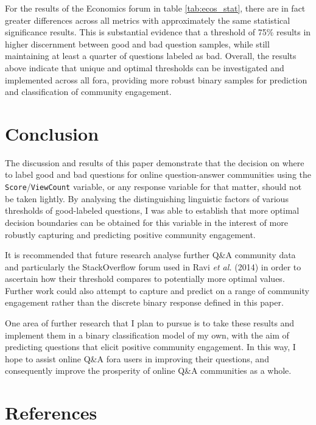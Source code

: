 \documentclass[12pt,preprint, authoryear]{article}
\numberwithin{equation}{section}
\numberwithin{figure}{section}
\numberwithin{table}{section}
\begin{document}
\normalsize

\newpage

For the results of the Economics forum in table \ref{tab:ecos_stat},
there are in fact greater differences across all metrics with
approximately the same statistical significance results. This is
substantial evidence that a threshold of 75\% results in higher
discernment between good and bad question samples, while still
maintaining at least a quarter of questions labeled as bad. Overall, the
results above indicate that unique and optimal thresholds can be
investigated and implemented across all fora, providing more robust
binary samples for prediction and classification of community
engagement.

\section{\texorpdfstring{Conclusion
\label{Concl}}{Conclusion }}\label{conclusion}

The discussion and results of this paper demonstrate that the decision
on where to label good and bad questions for online question-answer
communities using the \texttt{Score}/\texttt{ViewCount} variable, or any
response variable for that matter, should not be taken lightly. By
analysing the distinguishing linguistic factors of various thresholds of
good-labeled questions, I was able to establish that more optimal
decision boundaries can be obtained for this variable in the interest of
more robustly capturing and predicting positive community engagement.

It is recommended that future research analyse further Q\&A community
data and particularly the StackOverflow forum used in Ravi \emph{et al.}
(2014) in order to ascertain how their threshold compares to potentially
more optimal values. Further work could also attempt to capture and
predict on a range of community engagement rather than the discrete
binary response defined in this paper.

One area of further research that I plan to pursue is to take these
results and implement them in a binary classification model of my own,
with the aim of predicting questions that elicit positive community
engagement. In this way, I hope to assist online Q\&A fora users in
improving their questions, and consequently improve the prosperity of
online Q\&A communities as a whole.

\newpage

\section*{References}\label{references}
\end{document}
